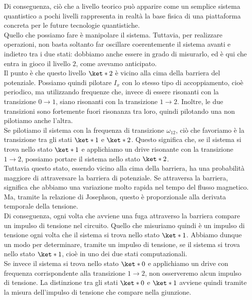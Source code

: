 Di conseguenza, ciò che a livello teorico può apparire come un semplice sistema quantistico a pochi livelli rappresenta in realtà la base fisica di una piattaforma concreta per le future tecnologie quantistiche.\\
Quello che possiamo fare è manipolare il sistema. Tuttavia, per realizzare operazioni, non basta soltanto far oscillare coerentemente il sistema avanti e indietro tra i due stati: dobbiamo anche essere in grado di misurarlo, ed è qui che entra in gioco il livello $2$, come avevamo anticipato.\\
Il punto è che questo livello $\ket*{2}$ è vicino alla cima della barriera del potenziale. Possiamo quindi pilotare $I_x$ con lo stesso tipo di accoppiamento, cioè periodico, ma utilizzando frequenze che, invece di essere risonanti con la transizione $0 \to 1$, siano risonanti con la transizione $1 \to 2$. Inoltre, le due transizioni sono fortemente fuori risonanza tra loro, quindi pilotando una non pilotiamo anche l'altra.\\
Se pilotiamo il sistema con la frequenza di transizione $\omega_{12}$, ciò che favoriamo è la transizione tra gli stati $\ket*{1}$ e $\ket*{2}$. Questo significa che, se il sistema si trova nello stato $\ket*{1}$ e applichiamo un drive risonante con la transizione $1 \to 2$, possiamo portare il sistema nello stato $\ket*{2}$.\\
Tuttavia questo stato, essendo vicino alla cima della barriera, ha una probabilità maggiore di attraversare la barriera di potenziale. Se attraversa la barriera, significa che abbiamo una variazione molto rapida nel tempo del flusso magnetico. Ma, tramite la relazione di Josephson, questo è proporzionale alla derivata temporale della tensione.\\
Di conseguenza, ogni volta che avviene una fuga attraverso la barriera compare un impulso di tensione nel circuito. Quello che misuriamo quindi è un impulso di tensione ogni volta che il sistema si trova nello stato $\ket*{1}$. Abbiamo dunque un modo per determinare, tramite un impulso di tensione, se il sistema si trova nello stato $\ket*{1}$, cioè in uno dei due stati computazionali.\\
Se invece il sistema si trova nello stato $\ket*{0}$ e applichiamo un drive con frequenza corrispondente alla transizione $1 \to 2$, non osserveremo alcun impulso di tensione. La distinzione tra gli stati $\ket*{0}$ e $\ket*{1}$ avviene quindi tramite la misura dell'impulso di tensione che compare nella giunzione.\\
